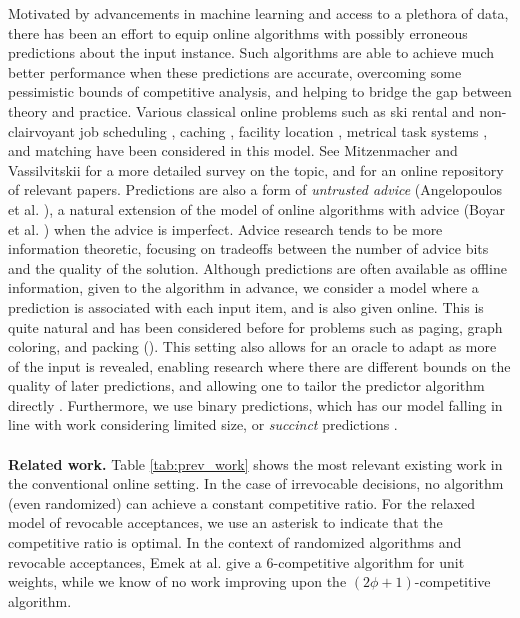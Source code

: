 Motivated by advancements in machine learning and access to a plethora of data, there has been an effort to equip online algorithms with possibly erroneous predictions about the input instance. Such algorithms are able to achieve much better performance when these predictions are accurate, overcoming some pessimistic bounds of competitive analysis, and helping to bridge the gap between theory and practice. Various classical online problems such as ski rental and non-clairvoyant job scheduling \cite{purohit2018improving}, caching \cite{lykouris2021competitive}, facility location \cite{almanza2021online}, metrical task systems \cite{antoniadis2023online}, and matching \cite{antoniadis2020secretary} have been considered in this model. See Mitzenmacher and Vassilvitskii \cite{DBLP:books/cu/20/MitzenmacherV20} for a more detailed survey on the topic, and \cite{ALPS} for an online repository of relevant papers. Predictions are also a form of \textit{untrusted advice} (Angelopoulos et al. \cite{angelopoulos2024online}), a natural extension of the model of online algorithms with advice (Boyar et al. \cite{boyar2017online}) when the advice is imperfect. Advice research tends to be more information theoretic, focusing on tradeoffs between the number of advice bits and the quality of the solution. Although predictions are often available as offline information, given to the algorithm in advance, we consider a model where a prediction is associated with each input item, and is also given online. This is quite natural and has been considered before for problems such as paging, graph coloring, and packing (\cite{lykouris2021competitive,rohatgi2020near,antoniadis2023paging,antoniadis2024online,grigorescu2024simple}). This setting also allows for an oracle to adapt as more of the input is revealed, enabling research where there are different bounds on the quality of later predictions, and allowing one to tailor the predictor algorithm directly \cite{elias2024learning}. Furthermore, we use binary predictions, which has our model falling in line with work considering limited size, or \textit{succinct} predictions \cite{antoniadis2023paging,berg2024complexity,angelopoulos2023contract}.\\\\
\textbf{Related work.} Table \ref{tab:prev_work} shows the most relevant existing work in the conventional online setting. In the case of irrevocable decisions, no algorithm (even randomized) can achieve a constant competitive ratio. For the relaxed model of revocable acceptances, we use an asterisk to indicate that the competitive ratio is optimal. In the context of randomized algorithms and revocable acceptances, Emek at al. \cite{emek2016space} give a $6$-competitive algorithm for unit weights, while we know of no work improving upon the $(2\phi + 1)$-competitive algorithm.

